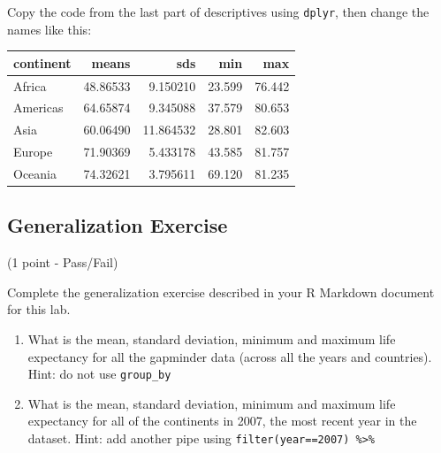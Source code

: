 \documentclass[]{book}
\newenvironment{Shaded}{\begin{snugshade}}{\end{snugshade}}
\newcommand{\KeywordTok}[1]{\textcolor[rgb]{0.13,0.29,0.53}{\textbf{#1}}}
\newcommand{\DataTypeTok}[1]{\textcolor[rgb]{0.13,0.29,0.53}{#1}}
\newcommand{\StringTok}[1]{\textcolor[rgb]{0.31,0.60,0.02}{#1}}
\newcommand{\OperatorTok}[1]{\textcolor[rgb]{0.81,0.36,0.00}{\textbf{#1}}}
\newcommand{\NormalTok}[1]{#1}
\begin{document}
Copy the code from the last part of descriptives using \texttt{dplyr},
then change the names like this:

\begin{Shaded}
\end{Shaded}

\begin{tabular}{l|r|r|r|r}
\hline
continent & means & sds & min & max\\
\hline
Africa & 48.86533 & 9.150210 & 23.599 & 76.442\\
\hline
Americas & 64.65874 & 9.345088 & 37.579 & 80.653\\
\hline
Asia & 60.06490 & 11.864532 & 28.801 & 82.603\\
\hline
Europe & 71.90369 & 5.433178 & 43.585 & 81.757\\
\hline
Oceania & 74.32621 & 3.795611 & 69.120 & 81.235\\
\hline
\end{tabular}

\subsection{Generalization Exercise}\label{generalization-exercise-1}

(1 point - Pass/Fail)

Complete the generalization exercise described in your R Markdown
document for this lab.

\begin{enumerate}
\def\labelenumi{\arabic{enumi}.}
\item
  What is the mean, standard deviation, minimum and maximum life
  expectancy for all the gapminder data (across all the years and
  countries). Hint: do not use \texttt{group\_by}
\item
  What is the mean, standard deviation, minimum and maximum life
  expectancy for all of the continents in 2007, the most recent year in
  the dataset. Hint: add another pipe using
  \texttt{filter(year==2007)\ \%\textgreater{}\%}
\end{enumerate}
\end{document}
